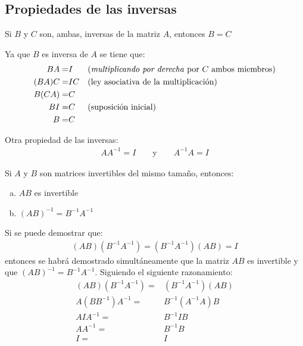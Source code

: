 \documentclass[a4paper,12pt]{article}
\begin{document}
\subsection{Propiedades de las inversas}

\begin{theorem}
  Si $B$ y $C$ son, ambas, inversas de la matriz $A$, entonces $B=C$
  \label{theo:propinv}
\end{theorem}

\demo Ya que $B$ es inversa de $A$ se tiene que:
\begin{align*}
     BA=&I && \mbox{(\emph{multiplicando por derecha} por $C$ ambos miembros)}\\
  (BA)C=&IC&& \mbox{(ley asociativa de la multiplicación)}\\
  B(CA)=&C && \\
     BI=&C && \mbox{(suposición inicial)} \\
      B=&C  
\end{align*}

Otra propiedad de las inversas:
\begin{align*}
  AA^{-1}=I \qquad \mbox{y} \qquad A^{-1}A=I
\end{align*}

\begin{theorem}
  Si $A$ y $B$ son matrices invertibles del mismo tamaño, entonces:
  \begin{enumerate}[(a)]
    \item $AB$ es invertible
    \item $(AB)^{-1}=B^{-1}A^{-1}$
  \end{enumerate}
  \label{theo:compinv}
\end{theorem}

\demo Si se puede demostrar que:
\begin{align*}
  (AB)(B^{-1}A^{-1})=(B^{-1}A^{-1})(AB)=I
\end{align*}
entonces se habrá demostrado simultáneamente que la matriz $AB$ es invertible
y que $(AB)^{-1}=B^{-1}A^{-1}$.
Siguiendo el siguiente razonamiento:
\begin{align*}
  (AB)(B^{-1}A^{-1})=&(B^{-1}A^{-1})(AB) \\
  A(BB^{-1})A^{-1}=&B^{-1}(A^{-1}A)B \\
  AIA^{-1}=&B^{-1}IB \\
  AA^{-1}=&B^{-1}B \\
  I=&I
\end{align*}
\end{document}
